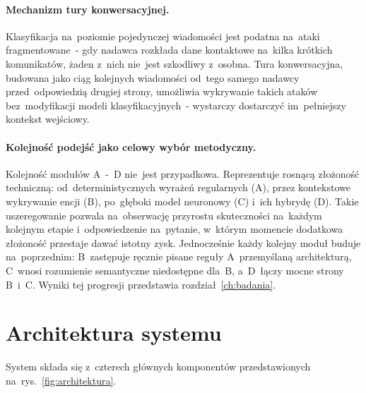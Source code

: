 \paragraph{Mechanizm tury konwersacyjnej.}
Klasyfikacja na~poziomie pojedynczej wiadomości jest podatna na~ataki
fragmentowane~- gdy nadawca rozkłada dane kontaktowe na~kilka krótkich
komunikatów, żaden z~nich nie~jest szkodliwy z~osobna. Tura konwersacyjna,
budowana jako ciąg kolejnych wiadomości od~tego samego nadawcy przed~odpowiedzią
drugiej strony, umożliwia wykrywanie takich ataków bez~modyfikacji modeli
klasyfikacyjnych~- wystarczy dostarczyć im~pełniejszy kontekst wejściowy.

\paragraph{Kolejność podejść jako celowy wybór metodyczny.}
Kolejność modułów A~-~D nie~jest przypadkowa. Reprezentuje rosnącą złożoność
techniczną: od~deterministycznych wyrażeń regularnych (A), przez kontekstowe
wykrywanie encji (B), po~głęboki model neuronowy (C) i~ich hybrydę (D).
Takie uszeregowanie pozwala na~obserwację przyrostu skuteczności na~każdym
kolejnym etapie i~odpowiedzenie na~pytanie, w~którym momencie dodatkowa
złożoność przestaje dawać istotny zysk. Jednocześnie każdy kolejny moduł
buduje na~poprzednim: B~zastępuje ręcznie pisane reguły A~przemyślaną
architekturą, C~wnosi rozumienie semantyczne niedostępne dla~B,
a~D~łączy mocne strony B~i~C. Wyniki tej progresji przedstawia
rozdział~\ref{ch:badania}.

\section{Architektura systemu}
\label{sec:architektura}

System składa się z~czterech głównych komponentów przedstawionych
na~rys.~\ref{fig:architektura}.

